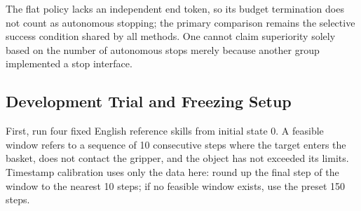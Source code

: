 The flat policy lacks an independent end token, so its budget termination does not count as autonomous stopping; the primary comparison remains the selective success condition shared by all methods. One cannot claim superiority solely based on the number of autonomous stops merely because another group implemented a stop interface.

\subsection{Development Trial and Freezing Setup}\label{s13-detail-2}

First, run four fixed English reference skills from initial state 0. A feasible window refers to a sequence of 10 consecutive steps where the target enters the basket, does not contact the gripper, and the object has not exceeded its limits. Timestamp calibration uses only the data here: round up the final step of the window to the nearest 10 steps; if no feasible window exists, use the preset 150 steps.


